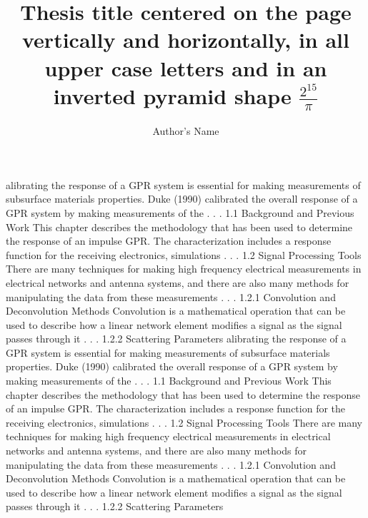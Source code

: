 \documentclass[letterpaper,12pt]{mines-thesis}
\title{Thesis title centered on the page vertically and horizontally,
	in all upper case letters and in an inverted pyramid shape $\frac{2^{15}}{\pi}$
 }         %
\author{Author's Name}  %
\begin{document}
	
	
	\makefrontmatter
alibrating the response of a GPR system is essential for making measurements of subsurface materials properties. Duke (1990) calibrated the overall response of a GPR system by making measurements of the . . .
1.1 Background and Previous Work
This chapter describes the methodology that has been used to determine the response of an impulse GPR. The characterization includes a response function for the receiving electronics, simulations . . .
1.2 Signal Processing Tools
There are many techniques for making high frequency electrical measurements in electrical networks and antenna systems, and there are also many methods for manipulating the data from these measurements . . .
1.2.1 Convolution and Deconvolution Methods
Convolution is a mathematical operation that can be used to describe how a linear network element modifies a signal as the signal passes through it . . .
1.2.2 Scattering Parameters
\newpage
alibrating the response of a GPR system is essential for making measurements of subsurface materials properties. Duke (1990) calibrated the overall response of a GPR system by making measurements of the . . .
1.1 Background and Previous Work
This chapter describes the methodology that has been used to determine the response of an impulse GPR. The characterization includes a response function for the receiving electronics, simulations . . .
1.2 Signal Processing Tools
There are many techniques for making high frequency electrical measurements in electrical networks and antenna systems, and there are also many methods for manipulating the data from these measurements . . .
1.2.1 Convolution and Deconvolution Methods
Convolution is a mathematical operation that can be used to describe how a linear network element modifies a signal as the signal passes through it . . .
1.2.2 Scattering Parameters
\end{document}
